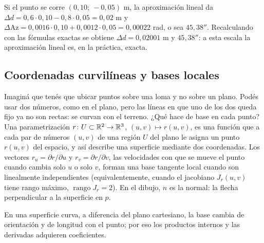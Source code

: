 \begin{ejemplo}
Si el punto se corre \((0{,}10;\ -0{,}05)\) m, la aproximación lineal da
\(\Delta d=0{,}6\cdot0{,}10-0{,}8\cdot0{,}05=0{,}02\) m y
\(\Delta\mathrm{Az}=0{,}0016\cdot0{,}10+0{,}0012\cdot0{,}05=0{,}00022\) rad, o sea
\(45{,}38''\). Recalculando con las fórmulas exactas se obtiene \(\Delta d=0{,}02001\) m y
\(45{,}38''\): a esta escala la aproximación lineal es, en la práctica, exacta.
\end{ejemplo}


\subsection{Coordenadas curvilíneas y bases locales}\label{sec:curvilineas}

Imaginá que tenés que ubicar puntos sobre una loma y no sobre un plano. Podés usar dos números,
como en el plano, pero las líneas en que uno de los dos queda fijo ya no son rectas: se curvan
con el terreno. ¿Qué hace de base en cada punto? Una parametrización
\(r\colon U\subset\mathbb{R}^2\to\mathbb{R}^3\), \((u,v)\mapsto r(u,v)\), es una función que a cada par de
números \((u,v)\) de una región \(U\) del plano le asigna un punto \(r(u,v)\) del espacio, y
así describe una superficie mediante dos coordenadas. Los vectores \(r_u=\partial r/\partial u\)
y \(r_v=\partial r/\partial v\), las velocidades con que se mueve el punto cuando cambia solo
\(u\) o solo \(v\), forman una base tangente local cuando son linealmente independientes (equivalentemente, cuando el jacobiano \(J_r(u,v)\) tiene rango máximo, \(\operatorname{rango}J_r=2\)). En el
dibujo, \(n\) es la normal: la flecha perpendicular a la superficie en \(p\).

\begin{center}
\end{center}

En una superficie curva, a diferencia del plano cartesiano, la base cambia de orientación y de
longitud con el punto; por eso los productos internos y las derivadas adquieren coeficientes.

